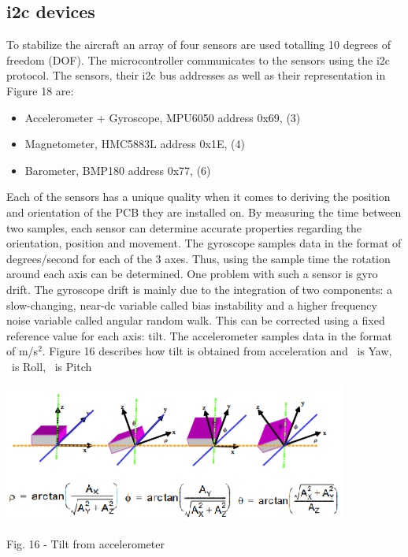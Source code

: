 \documentclass{IEEEtran}
\begin{document}
\subsection*{i2c devices}
To stabilize the aircraft an array of four sensors are used totalling 10 degrees of freedom (DOF). The microcontroller communicates to the sensors using the i2c protocol. The sensors, their i2c bus addresses as well as their representation in Figure 18 are:
\begin{itemize}
    \item Accelerometer + Gyroscope, MPU6050 address 0x69, (3)
    \item Magnetometer, HMC5883L address 0x1E, (4)
    \item Barometer, BMP180 address 0x77, (6)
\end{itemize}
Each of the sensors has a unique quality when it comes to deriving the position and orientation of the PCB they are installed on. By measuring the time between two samples, each sensor can determine accurate properties regarding the orientation, position and movement. The gyroscope samples data in the format of degrees/second for each of the 3 axes. Thus, using the sample time the rotation around each axis can be determined.
One problem with such a sensor is gyro drift. The gyroscope drift is mainly due to the integration of two components: a slow-changing, near-dc variable called bias instability and a higher frequency noise variable called angular random walk. This can be corrected using a fixed reference value for each axis: tilt. The accelerometer samples data in the format of m/s$^2$. Figure 16 describes how tilt is obtained from acceleration and \textrho\ is Yaw, \textPhi\ is Roll, \texttheta\ is Pitch
\begin{center}\includegraphics[scale=.95]{tilt.png}\end{center}
\begin{it}\begin{center}Fig. 16 - Tilt from accelerometer \end{center}\end{it}
\end{document}
